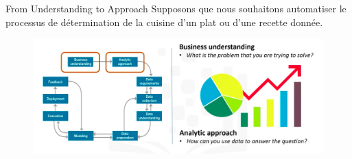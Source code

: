\documentclass{beamer}
\begin{document}
\begin{frame}{From Understanding to Approach}
		Supposons que nous souhaitons automatiser le processus de détermination de la cuisine d'un plat ou d'une recette donnée. 
	\begin{figure}
		\includegraphics[width=\textwidth]{From Understanding to Approach.png}
	\end{figure}
\end{frame}
\end{document}
